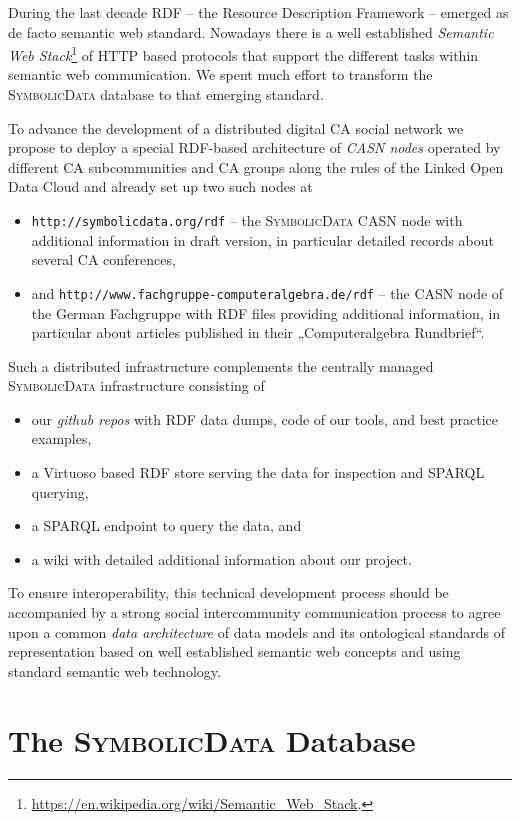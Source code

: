 \documentclass{mathincs}
\newcommand{\SD}{\textsc{Symbo\-lic\-Data}}
\begin{document}
During the last decade RDF -- the Resource Description Framework -- emerged as
de facto semantic web standard.  Nowadays there is a well established
\emph{Semantic Web
  Stack}\footnote{\url{https://en.wikipedia.org/wiki/Semantic_Web_Stack}.} of
HTTP based protocols that support the different tasks within semantic web
communication. We spent much effort to transform the {\SD} database to that
emerging standard.

To advance the development of a distributed digital CA social network we
propose to deploy a special RDF-based architecture of \emph{CASN nodes}
operated by different CA subcommunities and CA groups along the rules of the
Linked Open Data Cloud \cite{lod} and already set up two such nodes at
\begin{itemize}
\item \texttt{http://symbolicdata.org/rdf} -- the {\SD} CASN node with
  additional information in draft version, in particular detailed records about
  several CA conferences, 
\item and \texttt{http://www.fachgruppe-computeralgebra.de/rdf} -- the CASN
  node of the German Fachgruppe with RDF files providing additional information,
  in particular about articles published in their „Computeralgebra Rundbrief“.  
\end{itemize}
Such a distributed infrastructure complements the centrally managed {\SD }
infrastructure consisting of
\begin{itemize}
\item our \emph{github repos} \cite{sdrepo} with RDF data dumps, code of our
  tools, and best practice examples,
\item a Virtuoso based RDF store \cite{sdstore} serving the data for inspection
  and SPARQL querying, 
\item a SPARQL endpoint \cite{sdsparql} to query the data, and
\item a wiki \cite{sdwiki} with detailed additional information about our
  project. 
\end{itemize}
To ensure interoperability, this technical development process should be
accompanied by a strong social intercommunity communication process to agree
upon a common \emph{data architecture} of data models and its ontological
standards of representation based on well established semantic web concepts and
using standard semantic web technology.

\section{The {\SD} Database}
\end{document}
